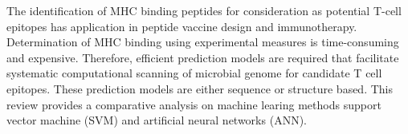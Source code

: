 
The identification of MHC binding peptides for consideration as potential T-cell epitopes has application in peptide vaccine design and immunotherapy. 
Determination of MHC binding using experimental measures is time-consuming and expensive. 
Therefore, efficient prediction models are required that facilitate systematic computational scanning of microbial genome for candidate T cell epitopes. 
These prediction models are either sequence or structure based. 
This review provides a comparative analysis on machine learing methods support vector machine (SVM) and artificial neural networks (ANN).